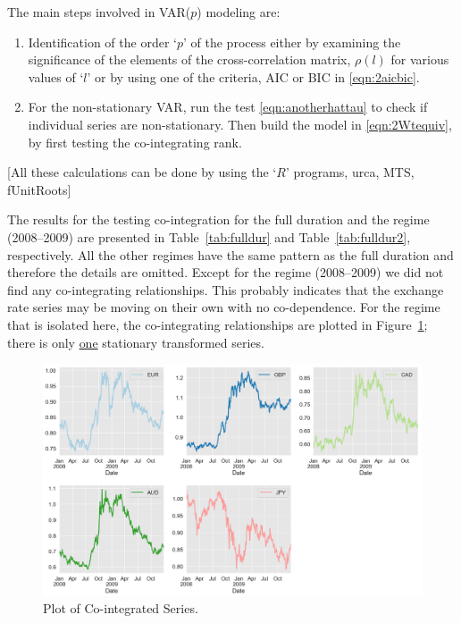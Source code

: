 The main steps involved in VAR($p$) modeling are:
	\begin{enumerate}[--]
	\item Identification of the order `$p$' of the process either by examining the significance of the elements of the cross-correlation matrix, $\rho(l)$ for various values of `$l$' or by using one of the criteria, AIC or BIC in \eqref{eqn:2aicbic}.
	\item For the non-stationary VAR, run the test \eqref{eqn:anotherhattau} to check if individual series are non-stationary. Then build the model in \eqref{eqn:2Wtequiv}, by first testing the co-integrating rank. 
	\end{enumerate}
[All these calculations can be done by using the `$R$' programs, urca, MTS, fUnitRoots]


The results for the testing co-integration for the full duration and the regime (2008--2009) are presented in Table~\ref{tab:fulldur} and Table~\ref{tab:fulldur2}, respectively. All the other regimes have the same pattern as the full duration and therefore the details are omitted. Except for the regime (2008--2009) we did not find any co-integrating relationships. This probably indicates that the exchange rate series may be moving on their own with no co-dependence. For the regime that is isolated here, the co-integrating relationships are plotted in Figure~\ref{fig:cointser}; there is only \underline{one} stationary transformed series.


	\begin{figure}[!ht]
	\centering
	\includegraphics[width=\textwidth]{chapters/chapter_mvts/figures/pcointser.png}
	\caption{Plot of Co-integrated Series. \label{fig:cointser}}
	\end{figure}
	
